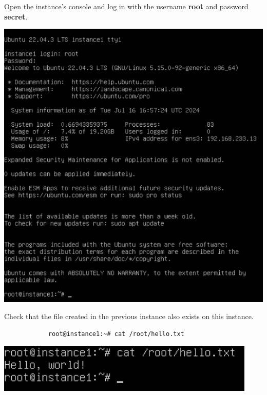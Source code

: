 \documentclass[letterpaper, 12pt]{article}
\begin{document}
\begin{enumerate}
    \begin{labstep}
        Open the instance's console and log in with the username \textbf{root} and password \textbf{secret}.

        \begin{center}
            \includegraphics[width=\linewidth]{images/part1/step18.png}
        \end{center}
    \end{labstep}

    \begin{labstep}
        Check that the file created in the previous instance also exists on this instance.
        \begin{lstlisting}
            root@instance1:~# cat /root/hello.txt
        \end{lstlisting}

        \begin{center}
            \includegraphics[width=\linewidth]{images/part1/step19.png}
        \end{center}
    \end{labstep}


\end{enumerate}
\end{document}
